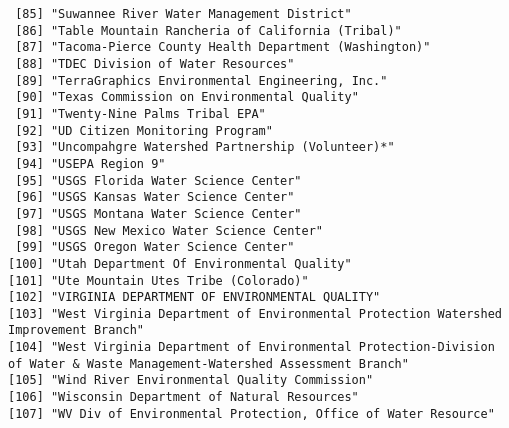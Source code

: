 \documentclass[
  12pt,
]{article}
\begin{document}
\begin{verbatim}
 [85] "Suwannee River Water Management District"                                                                             
 [86] "Table Mountain Rancheria of California (Tribal)"                                                                      
 [87] "Tacoma-Pierce County Health Department (Washington)"                                                                  
 [88] "TDEC Division of Water Resources"                                                                                     
 [89] "TerraGraphics Environmental Engineering, Inc."                                                                        
 [90] "Texas Commission on Environmental Quality"                                                                            
 [91] "Twenty-Nine Palms Tribal EPA"                                                                                         
 [92] "UD Citizen Monitoring Program"                                                                                        
 [93] "Uncompahgre Watershed Partnership (Volunteer)*"                                                                       
 [94] "USEPA Region 9"                                                                                                       
 [95] "USGS Florida Water Science Center"                                                                                    
 [96] "USGS Kansas Water Science Center"                                                                                     
 [97] "USGS Montana Water Science Center"                                                                                    
 [98] "USGS New Mexico Water Science Center"                                                                                 
 [99] "USGS Oregon Water Science Center"                                                                                     
[100] "Utah Department Of Environmental Quality"                                                                             
[101] "Ute Mountain Utes Tribe (Colorado)"                                                                                   
[102] "VIRGINIA DEPARTMENT OF ENVIRONMENTAL QUALITY"                                                                         
[103] "West Virginia Department of Environmental Protection Watershed Improvement Branch"                                    
[104] "West Virginia Department of Environmental Protection-Division of Water & Waste Management-Watershed Assessment Branch"
[105] "Wind River Environmental Quality Commission"                                                                          
[106] "Wisconsin Department of Natural Resources"                                                                            
[107] "WV Div of Environmental Protection, Office of Water Resource"                                                         
\end{verbatim}
\end{document}
